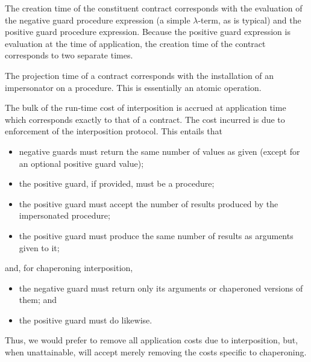 The creation time of the constituent contract corresponds with the evaluation of the negative guard procedure expression (a simple $\lambda$-term, as is typical) and the positive guard procedure expression.
Because the positive guard expression is evaluation at the time of application, the creation time of the contract corresponds to two separate times.

The projection time of a contract corresponds with the installation of an impersonator on a procedure.
This is essentially an atomic operation.

The bulk of the run-time cost of interposition is accrued at application time which corresponds exactly to that of a contract.
The cost incurred is due to enforcement of the interposition protocol.
This entails that
\begin{itemize}
\item negative guards must return the same number of values as given (except for an optional positive guard value);
\item the positive guard, if provided, must be a procedure;
\item the positive guard must accept the number of results produced by the impersonated procedure;
\item the positive guard must produce the same number of results as arguments given to it;
\end{itemize}
and, for chaperoning interposition,
\begin{itemize}
\item the negative guard must return only its arguments or chaperoned versions of them; and
\item the positive guard must do likewise.
\end{itemize}

Thus, we would prefer to remove all application costs due to interposition, but, when unattainable, will accept merely removing the costs specific to chaperoning.
